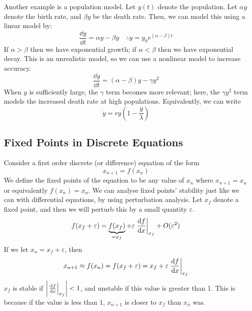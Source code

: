 \documentclass{article}
\begin{document}
	Another example is a population model. Let $y(t)$ denote the population. Let $\alpha y$ denote the birth rate, and $\beta y$ be the death rate. Then, we can model this using a linear model by:
	\[ \frac{\dd y}{\dd t} = \alpha y - \beta y \quad \therefore y = y_0 e^{(\alpha - \beta) t} \]
	If $\alpha > \beta$ then we have exponential growth; if $\alpha < \beta$ then we have exponential decay. This is an unrealistic model, so we can use a nonlinear model to increase accuracy.
	\[ \frac{\dd y}{\dd t} = (\alpha - \beta)y - \gamma y^2 \]
	When $y$ is sufficiently large, the $\gamma$ term becomes more relevant; here, the $\gamma y^2$ term models the increased death rate at high populations. Equivalently, we can write
	\[ \dot y = ry\left(1 - \frac{y}{\lambda}\right) \]

	\subsection{Fixed Points in Discrete Equations}
	Consider a first order discrete (or difference) equation of the form
	\[ x_{n+1} = f(x_n) \]
	We define the fixed points of the equation to be any value of $x_n$ where $x_{n+1} = x_n$ or equivalently $f(x_n) = x_n$. We can analyse fixed points' stability just like we can with differential equations, by using perturbation analysis. Let $x_f$ denote a fixed point, and then we will perturb this by a small quantity $\varepsilon$.
	\[ f(x_f + \varepsilon) = \underbrace{f(x_f)}_{\mathclap{=x_f}} + \varepsilon \eval{\frac{\dd f}{\dd x}}_{x_f} + O(\varepsilon^2) \]
	If we let $x_n = x_f + \varepsilon$, then
	\[ x_{n+1} \approx f(x_n) = f(x_f + \varepsilon) = x_f + \varepsilon \eval{\frac{\dd f}{\dd x}}_{x_f} \]
	$x_f$ is stable if $\abs{\eval{\frac{\dd f}{\dd x}}_{x_f}} < 1$, and unstable if this value is greater than 1. This is because if the value is less than 1, $x_{n+1}$ is closer to $x_f$ than $x_n$ was.
\end{document}
